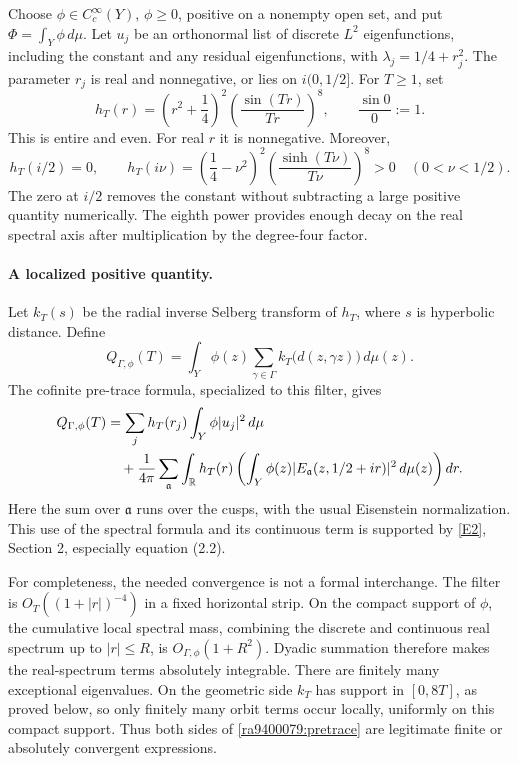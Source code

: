 \documentclass[11pt]{article}
\newcommand{\R}{\mathbb{R}}
\newcommand{\eref}[2]{\hyperlink{extra:#1:#2}{[E#2]}}
\begin{document}
Choose $\phi\in C_c^\infty(Y)$, $\phi\ge0$, positive on a nonempty open set,
and put $\Phi=\int_Y\phi\,d\mu$. Let $u_j$ be an orthonormal list of discrete
$L^2$ eigenfunctions, including the constant and any residual eigenfunctions,
with $\lambda_j=1/4+r_j^2$. The parameter $r_j$ is real and nonnegative,
or lies on $i(0,1/2]$. For $T\ge1$, set
\begin{equation}\label{ra9400079:filter}
 h_T(r)=\left(r^2+\frac14\right)^2
          \left(\frac{\sin(Tr)}{Tr}\right)^8,
 \qquad \frac{\sin 0}{0}:=1.
\end{equation}
This is entire and even. For real $r$ it is nonnegative. Moreover,
\begin{equation}\label{ra9400079:exception}
 h_T(i/2)=0,\qquad
 h_T(i\nu)=\left(\frac14-\nu^2\right)^2
             \left(\frac{\sinh(T\nu)}{T\nu}\right)^8>0
       \quad(0<\nu<1/2).
\end{equation}
The zero at $i/2$ removes the constant without subtracting a large positive
quantity numerically. The eighth power provides enough decay on the real
spectral axis after multiplication by the degree-four factor.

\paragraph{A localized positive quantity.}
Let $k_T(s)$ be the radial inverse Selberg transform of $h_T$, where $s$
is hyperbolic distance. Define
\begin{equation}\label{ra9400079:quantity}
 Q_{\Gamma,\phi}(T)=
 \int_Y\phi(z)\sum_{\gamma\in\Gamma}
                k_T\bigl(d(z,\gamma z)\bigr)\,d\mu(z).
\end{equation}
The cofinite pre-trace formula, specialized to this filter, gives
\begin{align}\label{ra9400079:pretrace}
 Q_{\Gamma,\phi}(T)
 &=\sum_j h_T(r_j)\int_Y\phi|u_j|^2\,d\mu \\
 &\quad+\frac1{4\pi}\sum_{\mathfrak a}
   \int_{\R}h_T(r)
      \left(\int_Y\phi(z)
        |E_{\mathfrak a}(z,1/2+ir)|^2\,d\mu(z)\right)dr.\notag
\end{align}
Here the sum over $\mathfrak a$ runs over the cusps, with the usual Eisenstein
normalization. This use of the spectral formula and its continuous term is
supported by \eref{9400079}{2}, Section 2, especially equation (2.2).

For completeness, the needed convergence is not a formal interchange.
The filter is $O_T((1+|r|)^{-4})$ in a fixed horizontal strip. On the compact
support of $\phi$, the cumulative local spectral mass, combining the discrete
and continuous real spectrum up to $|r|\le R$, is $O_{\Gamma,\phi}(1+R^2)$.
Dyadic summation therefore makes the real-spectrum terms absolutely
integrable. There are finitely many exceptional eigenvalues. On the geometric
side $k_T$ has support in $[0,8T]$, as proved below, so only finitely many
orbit terms occur locally, uniformly on this compact support. Thus both sides
of \eqref{ra9400079:pretrace} are legitimate finite or absolutely convergent
expressions.
\end{document}
